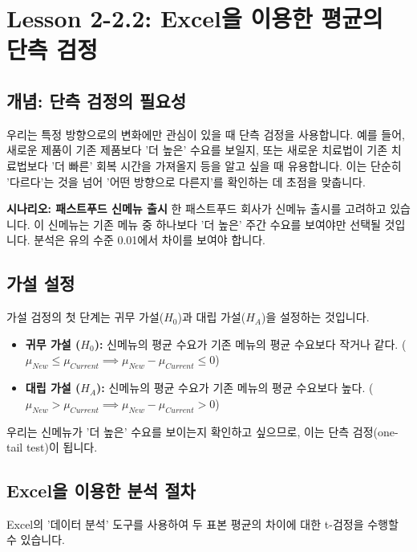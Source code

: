 \documentclass[11pt,a4paper]{article}
\begin{document}
\newpage
\section*{Lesson 2-2.2: Excel을 이용한 평균의 단측 검정}

\subsection*{개념: 단측 검정의 필요성}
우리는 특정 방향으로의 변화에만 관심이 있을 때 단측 검정을 사용합니다. 예를 들어, 새로운 제품이 기존 제품보다 '더 높은' 수요를 보일지, 또는 새로운 치료법이 기존 치료법보다 '더 빠른' 회복 시간을 가져올지 등을 알고 싶을 때 유용합니다. 이는 단순히 '다르다'는 것을 넘어 '어떤 방향으로 다른지'를 확인하는 데 초점을 맞춥니다.

\begin{examplebox}
\textbf{시나리오: 패스트푸드 신메뉴 출시}
한 패스트푸드 회사가 신메뉴 출시를 고려하고 있습니다. 이 신메뉴는 기존 메뉴 중 하나보다 '더 높은' 주간 수요를 보여야만 선택될 것입니다. 분석은 유의 수준 0.01에서 차이를 보여야 합니다.
\end{examplebox}

\subsection*{가설 설정}
가설 검정의 첫 단계는 귀무 가설($H_0$)과 대립 가설($H_A$)을 설정하는 것입니다.

\begin{itemize}
    \item \textbf{귀무 가설 ($H_0$):} 신메뉴의 평균 수요가 기존 메뉴의 평균 수요보다 작거나 같다.
    ($\mu_{New} \le \mu_{Current} \implies \mu_{New} - \mu_{Current} \le 0$)
    \item \textbf{대립 가설 ($H_A$):} 신메뉴의 평균 수요가 기존 메뉴의 평균 수요보다 높다.
    ($\mu_{New} > \mu_{Current} \implies \mu_{New} - \mu_{Current} > 0$)
\end{itemize}
우리는 신메뉴가 '더 높은' 수요를 보이는지 확인하고 싶으므로, 이는 단측 검정(one-tail test)이 됩니다.

\subsection*{Excel을 이용한 분석 절차}
Excel의 '데이터 분석' 도구를 사용하여 두 표본 평균의 차이에 대한 t-검정을 수행할 수 있습니다.
\end{document}
